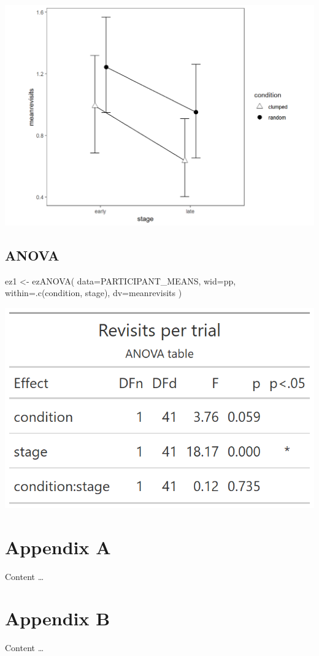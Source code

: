 \documentclass[
]{book}
\newenvironment{Shaded}{\begin{snugshade}}{\end{snugshade}}
\newcommand{\AttributeTok}[1]{\textcolor[rgb]{0.77,0.63,0.00}{#1}}
\newcommand{\FunctionTok}[1]{\textcolor[rgb]{0.00,0.00,0.00}{#1}}
\newcommand{\NormalTok}[1]{#1}
\newcommand{\OtherTok}[1]{\textcolor[rgb]{0.56,0.35,0.01}{#1}}
\begin{document}
\includegraphics[width=0.5\linewidth]{e1_figures/stage-revisits-1}

\hypertarget{anova}{%
\section{ANOVA}\label{anova}}

\begin{Shaded}
\begin{Highlighting}[]
\NormalTok{ez1 }\OtherTok{\textless{}{-}} \FunctionTok{ezANOVA}\NormalTok{(}
  \AttributeTok{data=}\NormalTok{PARTICIPANT\_MEANS,}
  \AttributeTok{wid=}\NormalTok{pp,}
  \AttributeTok{within=}\FunctionTok{.c}\NormalTok{(condition, stage),}
  \AttributeTok{dv=}\NormalTok{meanrevisits}
\NormalTok{)}
\end{Highlighting}
\end{Shaded}

\includegraphics[width=0.33\linewidth]{e1_figures/anova-table-revisits-1}

\hypertarget{appendix-appendices}{%
\appendix}


\hypertarget{appendix-a}{%
\chapter{Appendix A}\label{appendix-a}}

Content \ldots{}

\hypertarget{appendix-b}{%
\chapter{Appendix B}\label{appendix-b}}

Content \ldots{}

  
\end{document}
